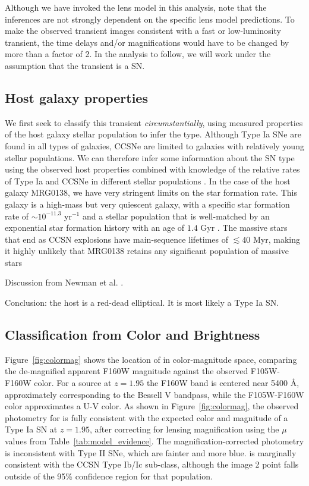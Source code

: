 \documentclass[twocolumn]{aastex63}
\begin{document}
Although we have invoked the lens model in this analysis, note that the inferences are not strongly dependent on the specific lens model predictions.  To make the observed transient images consistent with a fast or low-luminosity transient, the time delays and/or magnifications would have to be changed by more than a factor of 2.  In the analysis to follow, we will work under the assumption that the transient is a SN. 

\subsection{Host galaxy properties}
\label{ss:host}

We first seek to classify this transient {\it circumstantially}, using measured properties of the host galaxy stellar population to infer the type. Although Type Ia SNe are found in all types of galaxies, CCSNe are limited to galaxies with relatively young stellar populations.  We can therefore infer some information about the SN type using the observed host properties combined with knowledge of the relative rates of Type Ia and CCSNe in different stellar populations \citep{mannucci_rates_2005,foley_classifying_2013}.  In the case of the host galaxy MRG0138, we have very stringent limits on the star formation rate. This galaxy is a high-mass but very quiescent galaxy, with a specific star formation rate of $\sim10^{-11.3}$ yr$^{-1}$  and a stellar population that is well-matched by an exponential star formation history with an age of $1.4$ Gyr \cite{newman_resolving_2018}.  The massive stars that end as CCSN explosions have main-sequence lifetimes of $\lesssim 40$ Myr,  making it highly unlikely that MRG0138 retains any significant population of massive stars 


Discussion from Newman et al. \citep{newman_resolving_2018-1}.

Conclusion: the host is a red-dead elliptical. It is most likely a Type Ia SN.

\subsection{Classification from Color and Brightness}
\label{ss:lightcurve}

Figure~\ref{fig:colormag} shows the location of \SNABC in color-magnitude space, comparing the de-magnified apparent F160W magnitude against the observed F105W-F160W color.  
For a source at $z=1.95$ the F160W band is centered near 5400 \AA, approximately corresponding to the Bessell V bandpass, while the F105W-F160W color approximates a U-V color. 
As shown in Figure~\ref{fig:colormag}, the observed photometry for \SNABC is fully consistent with the expected color and magnitude of a Type Ia SN at $z=1.95$, after correcting for lensing magnification using the $\mu$ values from Table~\ref{tab:model_evidence}.  The magnification-corrected photometry is inconsistent with Type II SNe, which are fainter and more blue. \SNABC is marginally consistent with the CCSN Type Ib/Ic sub-class, although the image 2 point falls outside of the 95\% confidence region for that population.  
\end{document}
